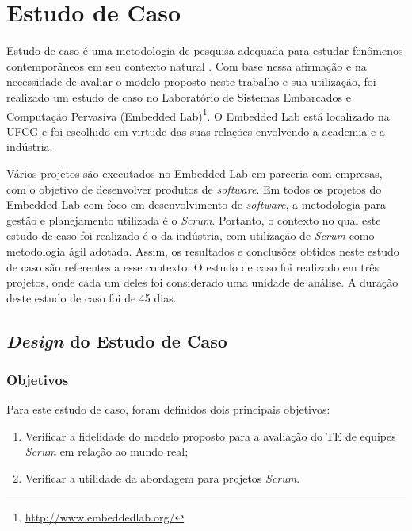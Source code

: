 \chapter{Estudo de Caso}
\label{estudodecaso}

Estudo de caso é uma metodologia de pesquisa adequada para estudar fenômenos contemporâneos em seu contexto natural \cite{runeson}. Com base nessa afirmação e na necessidade de avaliar o modelo proposto neste trabalho e sua utilização, foi realizado um estudo de caso no Laboratório de Sistemas Embarcados e Computação Pervasiva (Embedded Lab)\footnote{\url{http://www.embeddedlab.org/}}. O Embedded Lab está localizado na UFCG e foi escolhido em virtude das suas relações envolvendo a academia e a indústria.

Vários projetos são executados no Embedded Lab em parceria com empresas, com o objetivo de desenvolver produtos de \textit{software}. Em todos os projetos do Embedded Lab com foco em desenvolvimento de \textit{software}, a metodologia para gestão e planejamento utilizada é o \textit{Scrum}. Portanto, o contexto no qual este estudo de caso foi realizado é o da indústria, com utilização de \textit{Scrum} como metodologia ágil adotada. Assim, os resultados e conclusões obtidos neste estudo de caso são referentes a esse contexto. O estudo de caso foi realizado em três projetos, onde cada um deles foi considerado uma unidade de análise. A duração deste estudo de caso foi de 45 dias.

\section{\textit{Design} do Estudo de Caso}
\label{estudodecaso:design}

\subsection{Objetivos}
\label{estudodecaso:design:objetivos}

Para este estudo de caso, foram definidos dois principais objetivos:

\begin{enumerate}
  \item Verificar a fidelidade do modelo proposto para a avaliação do TE de equipes \textit{Scrum} em relação ao mundo real;
  \item Verificar a utilidade da abordagem para projetos \textit{Scrum}.
\end{enumerate}

